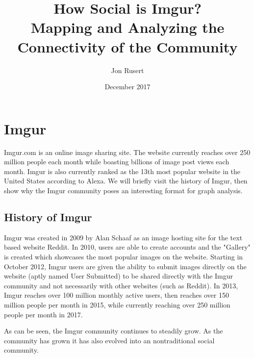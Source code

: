 \documentclass{article}
\title{How Social is Imgur?\\Mapping and Analyzing the Connectivity of the Community}
\author{Jon Rusert}
\date{December 2017}
\begin{document}
\maketitle

\section{Imgur}
\par Imgur.com is an online image sharing site. The website currently reaches over 250 million people each month while boasting billions of image post views each month\cite{imgurabout}. Imgur is also currently ranked as the 13th most popular website in the United States according to
Alexa\cite{alexa}. We will briefly visit the history of Imgur, then show why the Imgur community poses an interesting format for graph analysis.

\subsection{History of Imgur}
Imgur was created in 2009 by Alan Schaaf as an image hosting site for the text based website Reddit\cite{imgurabout}. In 2010, users are able to create accounts and the "Gallery" is created which showcases the most popular images on the website. Starting in October 2012, Imgur users are given the ability to submit images directly on the website (aptly named User Submitted) to be shared directly with the Imgur community and not necessarily with other websites (such as Reddit). In 2013, Imgur reaches over 100 million monthly active users, then reaches over 150 million people per month in 2015, while currently reaching over 250 million people per month in 2017. 
\par As can be seen, the Imgur community continues to steadily grow. As the community has grown it has also evolved into an nontraditional social community.
\end{document}
